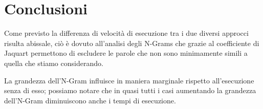 \documentclass{article}
\begin{document}
\section{Conclusioni}
Come previsto la differenza di velocità di esecuzione tra i due diversi approcci risulta abissale, ciò è dovuto all'analisi degli N-Grams che grazie al coefficiente di Jaquart permettono di escludere le parole che non sono minimamente simili a quella che stiamo considerando.

La grandezza dell'N-Gram influisce in maniera marginale rispetto all'esecuzione senza di esso; possiamo notare che in quasi tutti i casi aumentando la grandezza dell'N-Gram diminuiscono anche i tempi di esecuzione. 
\end{document}
